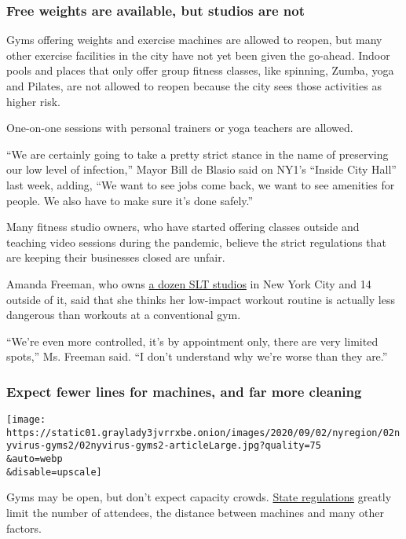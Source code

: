 \hypertarget{free-weights-are-available-but-studios-are-not}{%
\subsubsection{Free weights are available, but studios are
not}\label{free-weights-are-available-but-studios-are-not}}

Gyms offering weights and exercise machines are allowed to reopen, but
many other exercise facilities in the city have not yet been given the
go-ahead. Indoor pools and places that only offer group fitness classes,
like spinning, Zumba, yoga and Pilates, are not allowed to reopen
because the city sees those activities as higher risk.

One-on-one sessions with personal trainers or yoga teachers are allowed.

``We are certainly going to take a pretty strict stance in the name of
preserving our low level of infection,'' Mayor Bill de Blasio said on
NY1's ``Inside City Hall'' last week, adding, ``We want to see jobs come
back, we want to see amenities for people. We also have to make sure
it's done safely.''

Many fitness studio owners, who have started offering classes outside
and teaching video sessions during the pandemic, believe the strict
regulations that are keeping their businesses closed are unfair.

Amanda Freeman, who owns \href{https://sltnyc.com/}{a dozen SLT studios}
in New York City and 14 outside of it, said that she thinks her
low-impact workout routine is actually less dangerous than workouts at a
conventional gym.

``We're even more controlled, it's by appointment only, there are very
limited spots,'' Ms. Freeman said. ``I don't understand why we're worse
than they are.''

\hypertarget{expect-fewer-lines-for-machines-and-far-more-cleaning}{%
\subsubsection{Expect fewer lines for machines, and far more
cleaning}\label{expect-fewer-lines-for-machines-and-far-more-cleaning}}

\texttt{[image: https://static01.graylady3jvrrxbe.onion/images/2020/09/02/nyregion/02nyvirus-gyms2/02nyvirus-gyms2-articleLarge.jpg?quality=75\\\&auto=webp\\\&disable=upscale]}

Gyms may be open, but don't expect capacity crowds.
\href{https://www.governor.ny.gov/sites/governor.ny.gov/files/atoms/files/Gyms_and_Fitness_Centers_Detailed_Guidelines.pdf}{State
regulations} greatly limit the number of attendees, the distance between
machines and many other factors.

